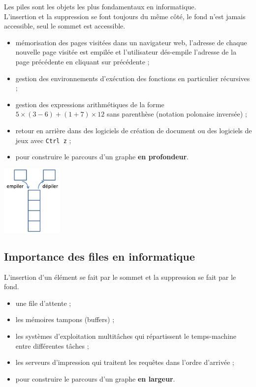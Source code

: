 Les piles sont les objets les plus fondamentaux en informatique.\\
L'insertion et la suppression se font toujours du même côté, le fond n'est jamais accessible, seul le sommet est accessible.\\


\begin{minipage}[c]{0.78\linewidth}
	\begin{itemize}
	\item mémorisation des pages visitées dans un navigateur web, l'adresse de chaque nouvelle page visitée est empilée et l'utilisateur dés-empile l'adresse de la page précédente en cliquant sur précédente ;
	\item gestion des environnements d'exécution des fonctions en particulier récursives ;
	\item gestion des expressions arithmétiques de la forme $5 \times (3-6)+(1+7) \times 12$ sans parenthèse (notation polonaise inversée) ;
	\item retour en arrière dans des logiciels de création de document ou des logiciels de jeux avec \texttt{Ctrl z} ;
	\item pour construire le parcours d'un graphe \textbf{en profondeur}.
	\end{itemize}
\end{minipage}
\hfill%
\begin{minipage}[c]{0.2\linewidth}
	\begin{center}
	\includegraphics[width=3cm]{images/pile1.png}
	\end{center}
\end{minipage}


\subsection{Importance des files en informatique}

L'insertion d'un élément se fait par le sommet et la suppression se fait par le fond.

\begin{itemize}
\item une file d'attente ;
\item les mémoires tampons (buffers) ;
\item les systèmes d'exploitation multitâches qui
répartissent le temps-machine entre différentes
tâches ;
\item les serveurs d'impression qui traitent les requêtes
dans l'ordre d'arrivée ;
\item pour construire le parcours d'un graphe \textbf{en largeur}.
\end{itemize}


